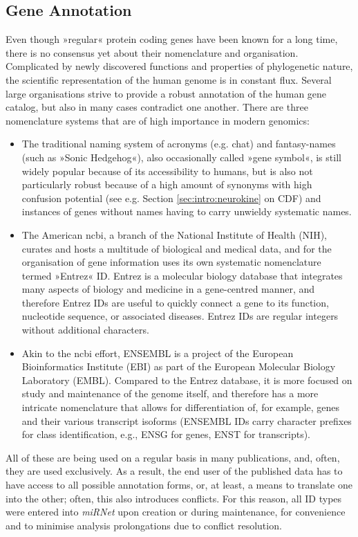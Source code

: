 \subsection{Gene Annotation}
Even though »regular« protein coding genes have been known for a long time, there is no consensus yet about their nomenclature and organisation. Complicated by newly discovered functions and properties of phylogenetic nature, the scientific representation of the human genome is in constant flux. Several large organisations strive to provide a robust annotation of the human gene catalog, but also in many cases contradict one another. There are three nomenclature systems that are of high importance in modern genomics: 
\begin{itemize}[noitemsep, leftmargin=.5cm, label={\tiny\raisebox{1ex}{\textbullet}}]
\item The traditional naming system of acronyms (e.g. \ac{chat}) and fantasy-names (such as »Sonic Hedgehog«), also occasionally called »gene symbol«, is still widely popular because of its accessibility to humans, but is also not particularly robust because of a high amount of synonyms with high confusion potential (see e.g. Section \ref{sec:intro:neurokine} on CDF) and instances of genes without names having to carry unwieldy systematic names.
\item The American \ac{ncbi}, a branch of the National Institute of Health (NIH), curates and hosts a multitude of biological and medical data, and for the organisation of gene information uses its own systematic nomenclature termed »Entrez« ID. Entrez is a molecular biology database that integrates many aspects of biology and medicine in a gene-centred manner, and therefore Entrez IDs are useful to quickly connect a gene to its function, nucleotide sequence, or associated diseases. Entrez IDs are regular integers without additional characters.
\item Akin to the \ac{ncbi} effort, ENSEMBL is a project of the European Bioinformatics Institute (EBI) as part of the European Molecular Biology Laboratory (EMBL). Compared to the Entrez database, it is more focused on study and maintenance of the genome itself, and therefore has a more intricate nomenclature that allows for differentiation of, for example, genes and their various transcript isoforms (ENSEMBL IDs carry character prefixes for class identification, e.g., ENSG for genes, ENST for transcripts).
\end{itemize}
All of these are being used on a regular basis in many publications, and, often, they are used exclusively. As a result, the end user of the published data has to have access to all possible annotation forms, or, at least, a means to translate one into the other; often, this also introduces conflicts. For this reason, all ID types were entered into \textit{miRNet} upon creation or during maintenance, for convenience and to minimise analysis prolongations due to conflict resolution.


